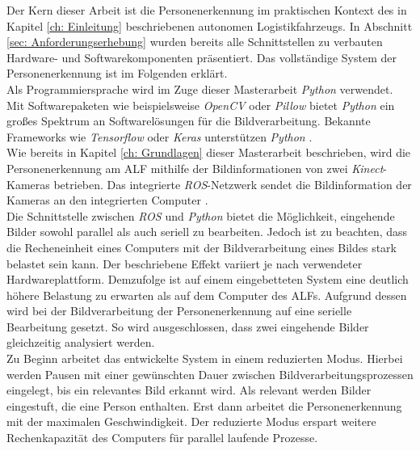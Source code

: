 	Der Kern dieser Arbeit ist die Personenerkennung im praktischen Kontext des in Kapitel \ref{ch: Einleitung} beschriebenen autonomen Logistikfahrzeugs. In Abschnitt \ref{sec: Anforderungserhebung} wurden bereits alle Schnittstellen zu verbauten Hardware- und Softwarekomponenten präsentiert. Das vollständige System der Personenerkennung ist im Folgenden erklärt.\\
	
 	Als Programmiersprache wird im Zuge dieser Masterarbeit \textit{Python} verwendet. Mit Softwarepaketen wie beispielsweise \textit{OpenCV} oder \textit{Pillow} bietet \textit{Python} ein großes Spektrum an Softwarelösungen für die Bildverarbeitung. Bekannte Frameworks wie \textit{Tensorflow} oder \textit{Keras} unterstützen \textit{Python} \cite{tensorflow, keraspython}.\\
	
	Wie bereits in Kapitel \ref{ch: Grundlagen} dieser Masterarbeit beschrieben, wird die Personenerkennung am ALF mithilfe der Bildinformationen von zwei \textit{Kinect}-Kameras betrieben.
	Das integrierte \textit{ROS}-Netzwerk sendet die Bildinformation der Kameras an den integrierten Computer \cite{Bachelorarbeit}.\\
	
	 Die Schnittstelle zwischen \textit{ROS} und \textit{Python} bietet die Möglichkeit, eingehende Bilder sowohl parallel als auch seriell zu bearbeiten. Jedoch ist zu beachten, dass die Recheneinheit eines Computers mit der Bildverarbeitung eines Bildes stark belastet sein kann. Der beschriebene Effekt variiert je nach verwendeter Hardwareplattform. Demzufolge ist auf einem eingebetteten System eine deutlich höhere Belastung zu erwarten als auf dem Computer des ALFs. Aufgrund dessen wird bei der Bildverarbeitung der Personenerkennung auf eine serielle Bearbeitung gesetzt. So wird ausgeschlossen, dass zwei eingehende Bilder gleichzeitig analysiert werden.\\
	

	Zu Beginn arbeitet das entwickelte System in einem reduzierten Modus. Hierbei werden Pausen mit einer gewünschten Dauer zwischen Bildverarbeitungsprozessen eingelegt, bis ein relevantes Bild erkannt wird. Als relevant werden Bilder eingestuft, die eine Person enthalten. Erst dann arbeitet die Personenerkennung mit der maximalen Geschwindigkeit. Der reduzierte Modus erspart weitere Rechenkapazität des Computers für parallel laufende Prozesse. \\
		

